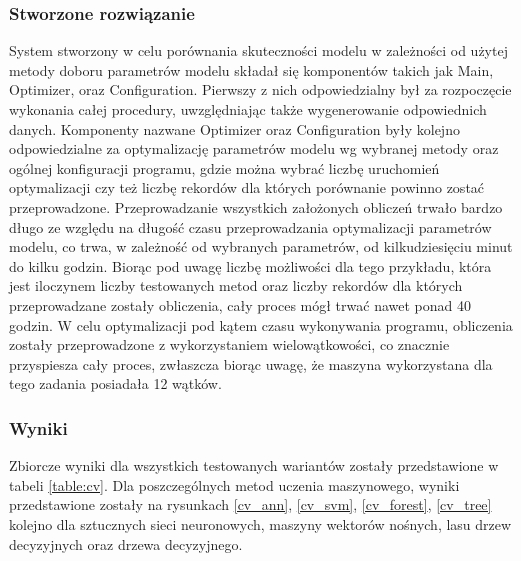 \subsubsection{Stworzone rozwiązanie}
System stworzony w celu porównania skuteczności modelu w zależności od użytej metody doboru parametrów modelu składał się komponentów takich jak Main, Optimizer, oraz Configuration. Pierwszy z nich odpowiedzialny był za rozpoczęcie wykonania całej procedury, uwzględniając także wygenerowanie odpowiednich danych. Komponenty nazwane Optimizer oraz Configuration były kolejno odpowiedzialne za optymalizację parametrów modelu wg wybranej metody oraz ogólnej konfiguracji programu, gdzie można wybrać liczbę uruchomień optymalizacji czy też liczbę rekordów dla których porównanie powinno zostać przeprowadzone. Przeprowadzanie wszystkich założonych obliczeń trwało bardzo długo ze względu na długość czasu przeprowadzania optymalizacji parametrów modelu, co trwa, w zależność od wybranych parametrów, od kilkudziesięciu minut do kilku godzin. Biorąc pod uwagę liczbę możliwości dla tego przykładu, która jest iloczynem liczby testowanych metod oraz liczby rekordów dla których przeprowadzane zostały obliczenia, cały proces mógł trwać nawet ponad 40 godzin. W celu optymalizacji pod kątem czasu wykonywania programu, obliczenia zostały przeprowadzone z wykorzystaniem wielowątkowości, co znacznie przyspiesza cały proces, zwłaszcza biorąc uwagę, że maszyna wykorzystana dla tego zadania posiadała 12 wątków. 
 
\subsubsection{Wyniki}
Zbiorcze wyniki dla wszystkich testowanych wariantów zostały przedstawione w tabeli \ref{table:cv}. Dla poszczególnych metod uczenia maszynowego, wyniki przedstawione zostały na rysunkach \ref{cv_ann}, \ref{cv_svm}, \ref{cv_forest}, \ref{cv_tree} kolejno dla sztucznych sieci neuronowych, maszyny wektorów nośnych, lasu drzew decyzyjnych oraz drzewa decyzyjnego.

